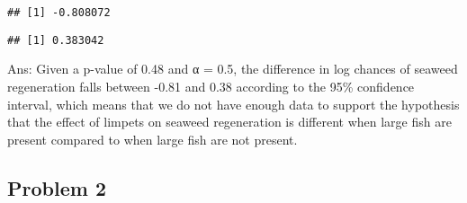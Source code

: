 \documentclass[
]{article}
\newenvironment{Shaded}{\begin{snugshade}}{\end{snugshade}}
\newcommand{\AttributeTok}[1]{\textcolor[rgb]{0.77,0.63,0.00}{#1}}
\newcommand{\DecValTok}[1]{\textcolor[rgb]{0.00,0.00,0.81}{#1}}
\newcommand{\FunctionTok}[1]{\textcolor[rgb]{0.00,0.00,0.00}{#1}}
\newcommand{\NormalTok}[1]{#1}
\newcommand{\OtherTok}[1]{\textcolor[rgb]{0.56,0.35,0.01}{#1}}
\newcommand{\SpecialCharTok}[1]{\textcolor[rgb]{0.00,0.00,0.00}{#1}}
\begin{document}
\begin{Shaded}
\end{Shaded}

\begin{verbatim}
## [1] -0.808072
\end{verbatim}

\begin{Shaded}
\end{Shaded}

\begin{verbatim}
## [1] 0.383042
\end{verbatim}

Ans: Given a p-value of 0.48 and α = 0.5, the difference in log chances
of seaweed regeneration falls between -0.81 and 0.38 according to the
95\% confidence interval, which means that we do not have enough data to
support the hypothesis that the effect of limpets on seaweed
regeneration is different when large fish are present compared to when
large fish are not present.

\hypertarget{problem-2}{%
\subsection{Problem 2}\label{problem-2}}
\end{document}
